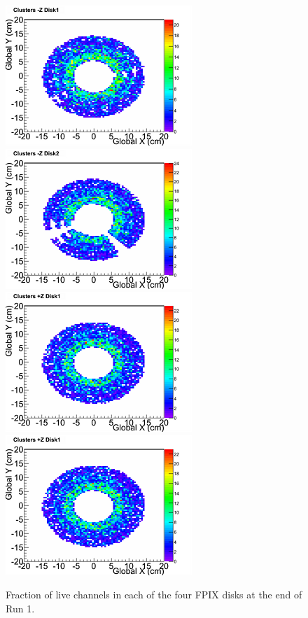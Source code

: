 \begin{figure}[hbtp]
  \begin{center}
    \includegraphics[width=1.0\cmsFigWidth]{figures/FPIX-d1-mz-before}
    \includegraphics[width=1.0\cmsFigWidth]{figures/FPIX-d2-mz-before}
    \includegraphics[width=1.0\cmsFigWidth]{figures/FPIX-d1-pz-before}
    \includegraphics[width=1.0\cmsFigWidth]{figures/FPIX-d1-pz-before}
    \caption{Fraction of live channels in each of the four FPIX disks at the end of Run 1.}
    \label{fig:fpix-live-before}
  \end{center}
\end{figure}

